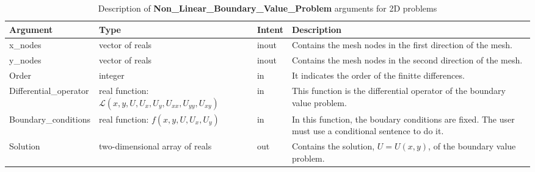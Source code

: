\begin{table}[H]
	\begin{center}
		\begin{spacing}{1.2}
			\begin{tabular}{| l | p{5cm}| l | p{4.5cm} |}
				
				\hline
				
				\bf Argument & \bf Type & \bf Intent & \bf Description \\ \hline \hline
				
				x\_nodes & vector of reals & inout &  Contains the mesh nodes in the first direction of the mesh.  \\ \hline
				
				y\_nodes & vector of reals & inout &  Contains the mesh nodes in the second direction of the mesh.  \\ \hline
				
				Order &  integer  & in & It indicates the order of the finitte differences.  \\ \hline
				
				Differential\_operator & \raggedright real function: $\mathscr{L}\left(x, y, U,  U_x,  U_y,  U_{xx},  U_{yy},  U_{xy} \right)$ & in  & This function is the differential operator of the boundary value problem.   \\ \hline
				
				Boundary\_conditions & \raggedright real function: $f\left(x, y, U,  U_x,  U_y \right)$  & in &  In this function, the boudary conditions are fixed. The user must use a conditional sentence to do it.  \\ \hline
				
				Solution & two-dimensional array of reals  & out &  Contains the solution, $U = U(x,  y)$, of the boundary value problem. \\ \hline
				
				
			\end{tabular}
		\end{spacing}
	\end{center}
	\caption{Description of \textbf{Non\_Linear\_Boundary\_Value\_Problem} arguments for 2D problems}
\end{table}